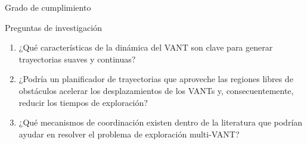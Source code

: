 \documentclass[24pt,aspectratio=169]{beamer}
\begin{document}
\begin{frame}{Grado de cumplimiento}
  
  \begin{block}{Preguntas de investigación}
    \small{
      \begin{enumerate}
      \item ¿Qué características de la dinámica del VANT son clave para generar trayectorias suaves y continuas? \\
      \item ¿Podría un planificador de trayectorias que aproveche las regiones libres de obstáculos acelerar los desplazamientos de los VANTs y, consecuentemente, reducir los tiempos de exploración? \\
      \item ¿Qué mecanismos de coordinación existen dentro de la literatura que podrían ayudar en resolver el problema de exploración multi-VANT? \\
      \end{enumerate}
    }
  \end{block}
\end{frame}
\end{document}
